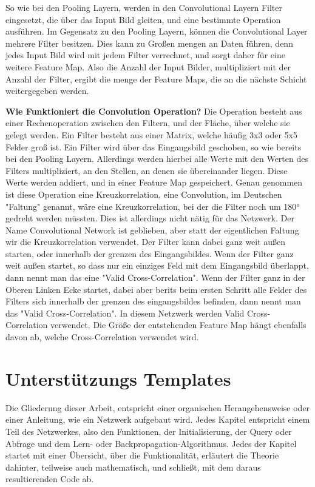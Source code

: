 \documentclass[12pt]{article}
\begin{document}
So wie bei den Pooling Layern, werden in den Convolutional Layern Filter eingesetzt, die über das Input Bild gleiten, und eine bestimmte Operation ausführen. Im Gegensatz zu den Pooling Layern, können die Convolutional Layer mehrere Filter besitzen. Dies kann zu Großen mengen an Daten führen, denn jedes Input Bild wird mit jedem Filter verrechnet, und sorgt daher für eine weitere Feature Map. Also die Anzahl der Input Bilder, multipliziert mit der Anzahl der Filter, ergibt die menge der Feature Maps, die an die nächste Schicht weitergegeben werden.

\textbf{Wie Funktioniert die Convolution Operation?}
Die Operation besteht aus einer Rechenoperation zwischen den Filtern, und der Fläche, über welche sie gelegt werden. Ein Filter besteht aus einer Matrix, welche häufig 3x3 oder 5x5 Felder groß ist. 
Ein Filter wird über das Eingangsbild geschoben, so wie bereits bei den Pooling Layern. Allerdings werden hierbei alle Werte mit den Werten des Filters multipliziert, an den Stellen, an denen sie übereinander liegen. Diese Werte werden addiert, und in einer Feature Map gespeichert.
Genau genommen ist diese Operation eine Kreuzkorrelation, eine Convolution, im Deutschen "Faltung" genannt, wäre eine Kreuzkorrelation, bei der die Filter noch um 180° gedreht werden müssten. Dies ist allerdings nicht nätig für das Netzwerk. Der Name Convolutional Network ist geblieben, aber statt der eigentlichen Faltung wir die Kreuzkorrelation verwendet.
Der Filter kann dabei ganz weit außen starten, oder innerhalb der grenzen des Eingangsbildes. Wenn der Filter ganz weit außen startet, so dass nur ein einziges Feld mit dem Eingangsbild überlappt, dann nennt man das eine "Valid Cross-Correlation". Wenn der Filter ganz in der Oberen Linken Ecke startet, dabei aber berits beim ersten Schritt alle Felder des Filters sich innerhalb der grenzen des eingangsbildes befinden, dann nennt man das "Valid Cross-Correlation".
In diesem Netzwerk werden Valid Cross-Correlation verwendet. Die Größe der entstehenden Feature Map hängt ebenfalls davon ab, welche Cross-Correlation verwendet wird. 

















\cleardoublepage
\section{Unterstützungs Templates}
Die Gliederung dieser Arbeit, entspricht einer organischen Herangehensweise oder einer Anleitung, wie ein Netzwerk aufgebaut wird. Jedes Kapitel entspricht einem Teil des Netzwerkes, also den Funktionen, der Initialisierung, der Query oder Abfrage und dem Lern- oder Backpropagation-Algorithmus. Jedes der Kapitel startet mit einer Übersicht, über die Funktionalität, erläutert die Theorie dahinter, teilweise auch mathematisch, und schließt, mit dem daraus resultierenden Code ab. 
\end{document}
